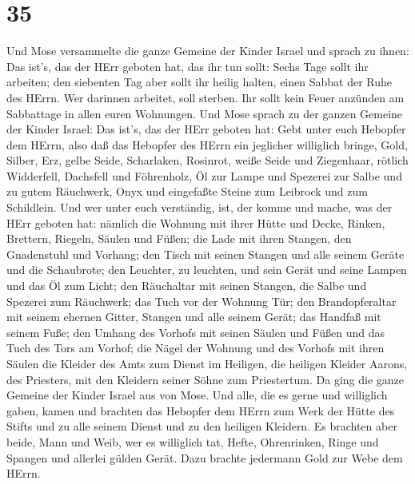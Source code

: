\hypertarget{section-34}{%
\section{35}\label{section-34}}

 Und Mose versammelte die ganze Gemeine der Kinder Israel
und sprach zu ihnen: Das ist's, das der HErr geboten hat, das ihr tun
sollt:  Sechs Tage sollt ihr arbeiten; den siebenten Tag
aber sollt ihr heilig halten, einen Sabbat der Ruhe des HErrn. Wer
darinnen arbeitet, soll sterben.  Ihr sollt kein Feuer
anzünden am Sabbattage in allen euren Wohnungen.  Und Mose
sprach zu der ganzen Gemeine der Kinder Israel: Das ist's, das der HErr
geboten hat:  Gebt unter euch Hebopfer dem HErrn, also daß
das Hebopfer des HErrn ein jeglicher williglich bringe, Gold, Silber,
Erz,  gelbe Seide, Scharlaken, Rosinrot, weiße Seide und
Ziegenhaar,  rötlich Widderfell, Dachsfell und Föhrenholz,
 Öl zur Lampe und Spezerei zur Salbe und zu gutem Räuchwerk,
 Onyx und eingefaßte Steine zum Leibrock und zum Schildlein.
 Und wer unter euch verständig, ist, der komme und mache,
was der HErr geboten hat:  nämlich die Wohnung mit ihrer
Hütte und Decke, Rinken, Brettern, Riegeln, Säulen und Füßen;
 die Lade mit ihren Stangen, den Gnadenstuhl und Vorhang;
 den Tisch mit seinen Stangen und alle seinem Geräte und
die Schaubrote;  den Leuchter, zu leuchten, und sein Gerät
und seine Lampen und das Öl zum Licht;  den Räuchaltar mit
seinen Stangen, die Salbe und Spezerei zum Räuchwerk; das Tuch vor der
Wohnung Tür;  den Brandopferaltar mit seinem ehernen
Gitter, Stangen und alle seinem Gerät; das Handfaß mit seinem Fuße;
 den Umhang des Vorhofs mit seinen Säulen und Füßen und das
Tuch des Tors am Vorhof;  die Nägel der Wohnung und des
Vorhofs mit ihren Säulen  die Kleider des Amts zum Dienst
im Heiligen, die heiligen Kleider Aarons, des Priesters, mit den
Kleidern seiner Söhne zum Priestertum.  Da ging die ganze
Gemeine der Kinder Israel aus von Mose.  Und alle, die es
gerne und williglich gaben, kamen und brachten das Hebopfer dem HErrn
zum Werk der Hütte des Stifts und zu alle seinem Dienst und zu den
heiligen Kleidern.  Es brachten aber beide, Mann und Weib,
wer es williglich tat, Hefte, Ohrenrinken, Ringe und Spangen und
allerlei gülden Gerät. Dazu brachte jedermann Gold zur Webe dem HErrn.
